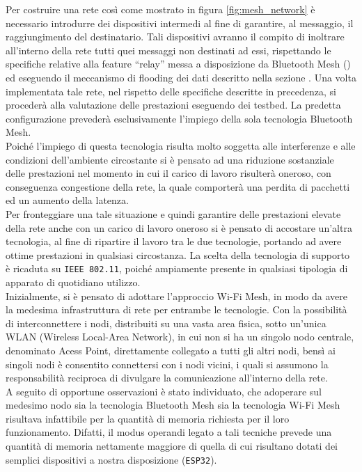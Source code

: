\noindent Per costruire una rete così come mostrato in figura \ref{fig:mesh_network} è necessario introdurre dei dispositivi intermedi al fine di garantire, al messaggio, il raggiungimento del destinatario. Tali dispositivi avranno il compito di inoltrare all'interno della rete tutti quei messaggi non destinati ad essi, rispettando le specifiche relative alla feature ``relay'' messa a disposizione da Bluetooth Mesh (\textit{}) ed eseguendo il meccanismo di flooding dei dati descritto nella sezione \textit{}. Una volta implementata tale rete, nel rispetto delle specifiche descritte in precedenza,
si procederà alla valutazione delle prestazioni eseguendo dei testbed. La predetta configurazione prevederà esclusivamente l'impiego della sola tecnologia Bluetooth Mesh.\\
Poiché l'impiego di questa tecnologia risulta molto soggetta alle interferenze e alle condizioni dell'ambiente circostante si è pensato ad una riduzione sostanziale delle prestazioni nel momento in cui il carico di lavoro risulterà oneroso, con conseguenza congestione della rete, la quale comporterà una perdita di pacchetti ed un aumento della latenza.\\
Per fronteggiare una tale situazione e quindi garantire delle prestazioni elevate della rete anche con un carico di lavoro oneroso si è pensato di accostare un'altra tecnologia, al fine di ripartire il lavoro tra le due tecnologie, portando ad avere ottime prestazioni in qualsiasi circostanza. La scelta della tecnologia di supporto è ricaduta su \texttt{IEEE 802.11}, poiché ampiamente presente in qualsiasi tipologia di apparato di quotidiano utilizzo.\\
Inizialmente, si è pensato di adottare l'approccio Wi-Fi Mesh, in modo da avere la medesima infrastruttura di rete per entrambe le tecnologie. Con la possibilità di interconnettere i nodi, distribuiti su una vasta area fisica, sotto un'unica WLAN (Wireless Local-Area Network), in cui non si ha un singolo nodo centrale, denominato Acess Point, direttamente collegato a tutti gli altri nodi, bensì ai singoli nodi è consentito connettersi con i nodi vicini, i quali si assumono la responsabilità reciproca di divulgare la comunicazione all'interno della rete.\\
A seguito di opportune osservazioni è stato individuato, che adoperare sul medesimo nodo sia la tecnologia Bluetooth Mesh sia la tecnologia Wi-Fi Mesh risultava infattibile per la quantità di memoria richiesta per il loro funzionamento. Difatti, il modus operandi legato a tali tecniche prevede una quantità di memoria nettamente maggiore di quella di cui risultano dotati dei semplici dispositivi a nostra disposizione (\texttt{ESP32}). \\

